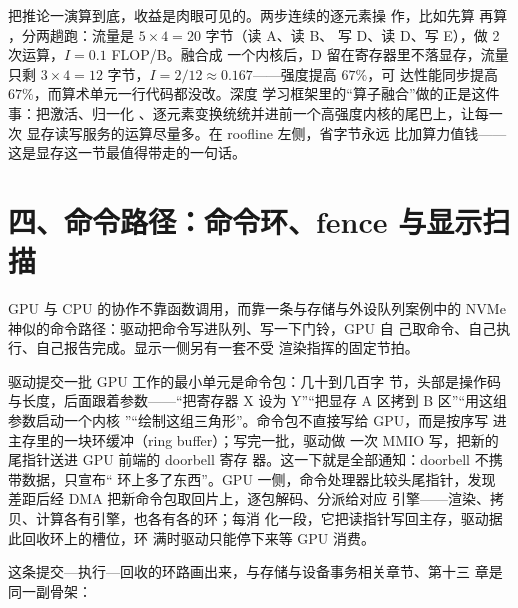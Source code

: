 把推论一演算到底，收益是肉眼可见的。两步连续的逐元素操
作，比如先算  再算 ，分两趟跑：流量是 $5\times4=20$ 字节（读 A、读 B、
写 D、读 D、写 E），做 2 次运算，$I=0.1$ FLOP/B。融合成
一个内核后，D 留在寄存器里不落显存，流量只剩 $3\times4
=12$ 字节，$I=2/12\approx0.167$——强度提高 $67\%$，可
达性能同步提高 $67\%$，而算术单元一行代码都没改。深度
学习框架里的“算子融合”做的正是这件事：把激活、归一化
、逐元素变换统统并进前一个高强度内核的尾巴上，让每一次
显存读写服务的运算尽量多。在 roofline 左侧，省字节永远
比加算力值钱——这是显存这一节最值得带走的一句话。

\section{四、命令路径：命令环、fence 与显示扫描}

GPU 与 CPU 的协作不靠函数调用，而靠一条与存储与外设队列案例中的 NVMe
神似的命令路径：驱动把命令写进队列、写一下门铃，GPU 自
己取命令、自己执行、自己报告完成。显示一侧另有一套不受
渲染指挥的固定节拍。

驱动提交一批 GPU 工作的最小单元是命令包：几十到几百字
节，头部是操作码与长度，后面跟着参数——“把寄存器 X
设为 Y”“把显存 A 区拷到 B 区”“用这组参数启动一个内核
”“绘制这组三角形”。命令包不直接写给 GPU，而是按序写
进主存里的一块环缓冲（ring buffer）；写完一批，驱动做
一次 MMIO 写，把新的尾指针送进 GPU 前端的 doorbell 寄存
器。这一下就是全部通知：doorbell 不携带数据，只宣布“
环上多了东西”。GPU 一侧，命令处理器比较头尾指针，发现
差距后经 DMA 把新命令包取回片上，逐包解码、分派给对应
引擎——渲染、拷贝、计算各有引擎，也各有各的环；每消
化一段，它把读指针写回主存，驱动据此回收环上的槽位，环
满时驱动只能停下来等 GPU 消费。

这条提交—执行—回收的环路画出来，与存储与设备事务相关章节、第十三
章是同一副骨架：


